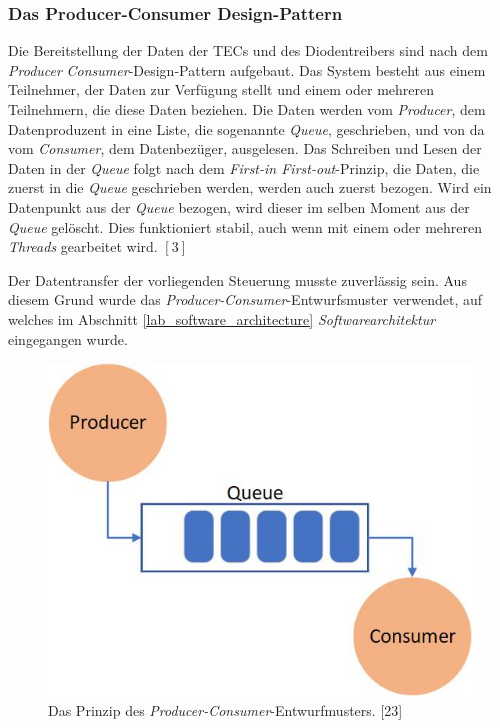 \subsubsection{Das Producer-Consumer Design-Pattern}
\label{section:_producer_consumer}
Die Bereitstellung der Daten der TECs und des Diodentreibers sind nach dem \textit{Producer} \textit{Consumer}-Design-Pattern aufgebaut. Das System besteht aus einem Teilnehmer, der Daten zur Verfügung stellt und einem oder mehreren Teilnehmern, die diese Daten beziehen. Die Daten werden vom \textit{Producer}, dem Datenproduzent in eine Liste, die sogenannte \textit{Queue}, geschrieben, und von da vom \textit{Consumer}, dem Datenbezüger, ausgelesen. Das Schreiben und Lesen der Daten in der \textit{Queue} folgt nach dem \textit{First-in First-out}-Prinzip, die Daten, die zuerst in die \textit{Queue} geschrieben werden, werden auch zuerst bezogen. Wird ein Datenpunkt aus der \textit{Queue} bezogen, wird dieser im selben Moment aus der \textit{Queue} gelöscht. Dies funktioniert stabil, auch wenn mit einem oder mehreren \textit{Threads} gearbeitet wird. $[3]$

Der Datentransfer der vorliegenden Steuerung musste zuverlässig sein. Aus diesem Grund wurde das \textit{Producer-Consumer}-Entwurfsmuster verwendet, auf welches im Abschnitt \ref{lab_software_architecture}  \textit{Softwarearchitektur} eingegangen wurde.

\begin{figure}[H]
    \centering
    \includegraphics[scale=0.5]{98_images/producer_consumer_design_pattern.jpg}
    \caption{Das Prinzip des \textit{Producer-Consumer}-Entwurfmusters. [23]}
    \label{fig:_producer_consumer}
 \end{figure}

